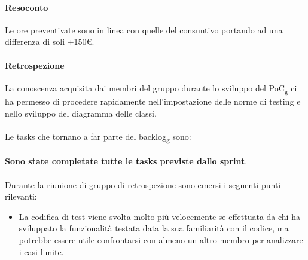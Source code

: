 \paragraph{Resoconto}
Le ore preventivate sono in linea con quelle del consuntivo portando ad una differenza di soli +150\euro.

\paragraph{Retrospezione}
La conoscenza acquisita dai membri del gruppo durante lo sviluppo del PoC\textsubscript{g} ci ha permesso di procedere rapidamente nell'impostazione delle norme di testing e nello sviluppo del diagramma delle classi. 
\\\\
Le tasks che tornano a far parte del backlog\textsubscript{g} sono:
\\\\
\textbf{Sono state completate tutte le tasks previste dallo sprint}.
\\\\
\noindent Durante la riunione di gruppo di retrospezione sono emersi i seguenti punti rilevanti:
\begin{itemize}
	\item La codifica di test viene svolta molto più velocemente se effettuata da chi ha sviluppato la funzionalità testata data la sua familiarità con il codice, ma potrebbe essere utile confrontarsi con almeno un altro membro per analizzare i casi limite.
\end{itemize}